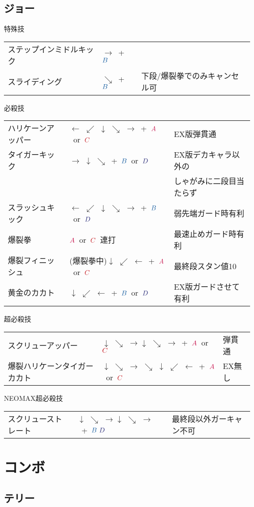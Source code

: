 \documentclass[a4j,11pt]{jarticle}
\def\A{\textcolor{Acolor}{A}}
\def\C{\textcolor{Ccolor}{C}}
\def\B{\textcolor{Bcolor}{B}}
\def\D{\textcolor{Dcolor}{D}}
\def\hado{$\downarrow$ $\searrow$ $\rightarrow$}%
\def\tatsu{$\downarrow$ $\swarrow$ $\leftarrow$}%
\def\syoryu{$\rightarrow$ $\downarrow$ $\searrow$}%
\def\yoga{$\leftarrow$ $\swarrow$ $\downarrow$ $\searrow$ $\rightarrow$}%
\def\ryuko{$\downarrow$ $\searrow$ $\rightarrow$ $\searrow$ $\downarrow$ $\swarrow$ $\leftarrow$}%
\begin{document}
\subsection{ジョー}
\begin{itembox}[l]{特殊技}
\begin{tabular}{lll}
ステップインミドルキック&$\rightarrow$\ +\ $\B$&\\
スライディング&$\searrow$\ +\ $\B$&下段/爆裂拳でのみキャンセル可
\end{tabular}
\end{itembox}
\begin{itembox}[l]{必殺技}
\begin{tabular}{lll}
ハリケーンアッパー&\yoga\ +\ $\A$\ or\ $\C$&EX版弾貫通 \times 3\\
タイガーキック&\syoryu\ +\ $\B$\ or\ $\D$&EX版デカキャラ以外の\\
&&しゃがみに二段目当たらず\\
スラッシュキック&\yoga\ +\ $\B$\ or\ $\D$&弱先端ガード時有利\\
爆裂拳&$\A$\ or\ $\C$\ 連打&最速止めガード時有利\\
爆裂フィニッシュ&(爆裂拳中)\tatsu\ +\ $\A$\ or\ $\C$&最終段スタン値10\\
黄金のカカト&\tatsu\ +\ $\B$\ or\ $\D$&EX版ガードさせて有利
\end{tabular}
\end{itembox}
\begin{itembox}[l]{超必殺技}
\begin{tabular}{lll}
スクリューアッパー&\hado\hado\ +\ $\A$\ or\ $\C$&弾貫通\\
爆裂ハリケーンタイガーカカト&\ryuko\ +\ $\A$\ or\ $\C$&EX無し
\end{tabular}
\end{itembox}
\begin{itembox}[l]{NEOMAX超必殺技}
\begin{tabular}{lll}
スクリューストレート&\hado\hado\ +\ $\B\ \D$&最終段以外ガーキャン不可
\end{tabular}
\end{itembox}
\newpage
\section{コンボ}
\subsection{テリー}
\end{document}
